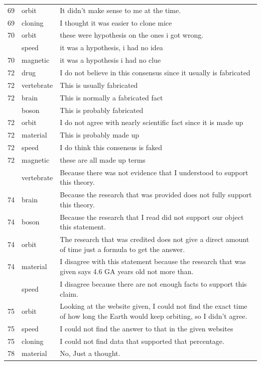 \documentclass[
  doc,floatsintext]{apa6}
\begin{document}
\begin{longtable}[t]{>{}r>{}l>{\raggedright\arraybackslash}p{30em}}
69 & orbit & It didn't make sense to me at the time.\\
69 & cloning & I thought it was easier to clone mice\\
70 & orbit & these were hypothesis on the ones i got wrong.\\
\addlinespace
70 & speed & it was a hypothesis, i had no idea\\
70 & magnetic & it was a hypothesis i had no clue\\
72 & drug & I do not believe in this consensus since it usually is fabricated\\
72 & vertebrate & This is usually fabricated\\
72 & brain & This is normally a fabricated fact\\
\addlinespace
72 & boson & This is probably fabricated\\
72 & orbit & I do not agree with nearly scientific fact since it is made up\\
72 & material & This is probably made up\\
72 & speed & I do think this consensus is faked\\
72 & magnetic & these are all made up terms\\
\addlinespace
74 & vertebrate & Because there was not evidence that I understood to support this theory.\\
74 & brain & Because the research that was provided does not fully support this theory.\\
74 & boson & Because the research that I read did not support our object this statement.\\
74 & orbit & The research that was credited does not give a direct amount of time just a formula to get the answer.\\
74 & material & I disagree with this statement because the research that was given says 4.6 GA years old not more than.\\
\addlinespace
74 & speed & I disagree because there are not enough facts to support this claim.\\
75 & orbit & Looking at the website given, I could not find the exact time of how long the Earth would keep orbiting, so I didn't agree.\\
75 & speed & I could not find the answer to that in the given websites\\
75 & cloning & I could not find data that supported that percentage.\\
78 & material & No, Just a thought.\\

\end{longtable}
\end{document}
